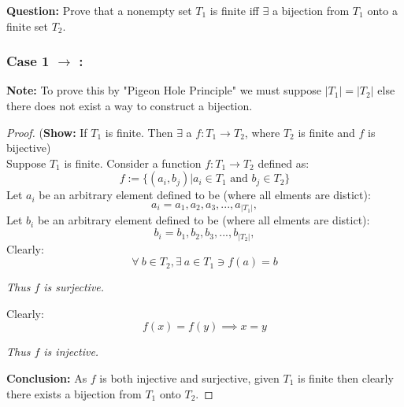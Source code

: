 \documentclass[11pt]{article}
\theoremstyle{plain}
\begin{document}
\textbf{Question:} Prove that a nonempty set $T_1$ is finite iff $\exists$ a bijection from $T_1$ onto a finite set $T_2$.
\subsubsection*{Case 1 $\rightarrow$  :}
\textbf{Note:} To prove this by "Pigeon Hole Principle" we must suppose $|T_1| = |T_2|$ else there does not exist a way to construct a bijection.
\begin{proof} (\textbf{Show:} If $T_1$ is finite. Then $\exists$ a $f: T_1 \rightarrow  T_2$, where $T_2$ is finite and $f$ is bijective) \\
	Suppose $T_1$ is finite. Consider a function $f: T_1 \rightarrow T_2$ defined as:
	\[
		f := \{ (a_i,b_j) | a_i \in T_1 \text{ and } b_j \in T_2 \}
	\]
	Let $a_i$ be an arbitrary element defined to be (where all elments are distict):
	\[
		a_i = a_1, a_2, a_3, ..., a_{|T_1|},
	\]
	Let $b_i$ be an arbitrary element defined to be (where all elments are distict):
	\[
		b_i = b_1, b_2, b_3, ..., b_{|T_2|},
	\]
	Clearly:
	\[
		\forall ~b \in T_2, \exists ~a \in T_1 \ni f(a)= b
	\]
    \begin{center}
        \textit{Thus $f$ is surjective.}
    \end{center}
	Clearly:
	\[
		f(x) = f(y) \implies x = y
	\]
    \begin{center}
        \textit{Thus $f$ is injective.}
    \end{center}
	\textbf{Conclusion:} As $f$ is both injective and surjective, given $T_1$ is finite then clearly there exists a bijection from $T_1$ onto $T_2$.
\end{proof}
\end{document}
